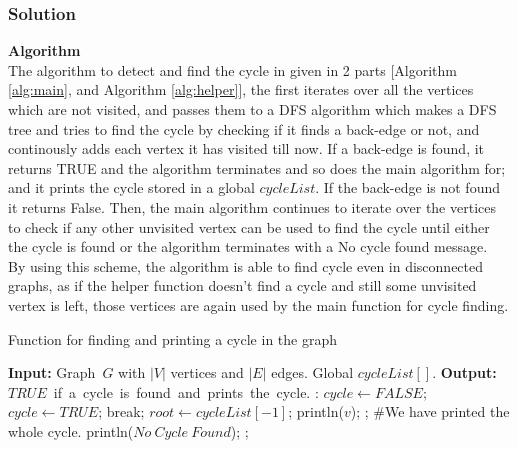 \documentclass{article}
\begin{document}
\subsubsection*{Solution}
\textbf{Algorithm}\\
The algorithm to detect and find the cycle in given in 2 parts [Algorithm \ref{alg:main}, and Algorithm \ref{alg:helper}], the first iterates over all the vertices which are not visited, and passes them to a DFS algorithm which makes a DFS tree and tries to find the cycle by checking if it finds a back-edge or not, and continously adds each vertex it has visited till now. If a back-edge is found, it returns TRUE and the algorithm terminates and so does the main algorithm for; and it prints the cycle stored in a global $cycleList$.  If the back-edge is not found it returns False. Then, the main algorithm continues to iterate over the vertices to check if any other unvisited vertex can be used to find the cycle until either the cycle is found or the algorithm terminates with a No cycle found message.\\
By using this scheme, the algorithm is able to find cycle even in disconnected graphs, as if the helper function doesn't find a cycle and still some unvisited vertex is left, those vertices are again used by the main function for cycle finding.\\
\begin{algorithm}
\caption{Function for finding and printing a cycle in the graph}
\label{alg:main}
\begin{algorithmic}[1]
\State \textbf{Input:} Graph\ $G$ with $|V|$ vertices and $|E|$ edges. Global $cycleList[]$.
\State \textbf{Output:} $TRUE$\ if\ a\ cycle\ is\ found\ and\ prints\ the\ cycle.
:
\State $cycle\leftarrow FALSE;$
\State $cycle\leftarrow TRUE$;
\State break;
\EndIf
\EndIf
\EndFor
{}
\State $root \leftarrow cycleList[-1]$;
\State println($v$);
\State \Return; \#We have printed the whole cycle.
\EndIf
\EndFor
\Else
\State println($No\ Cycle\ Found$);
\EndIf
\State \Return;
\EndFunction
\end{algorithmic}
\end{algorithm}
\end{document}
